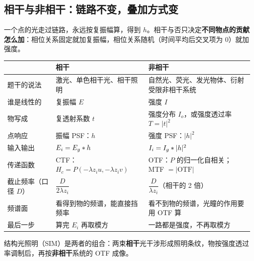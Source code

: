 \subsection*{相干与非相干：链路不变，叠加方式变}\label{sec:p-cohtable}
一个点的光走过链路，永远按复振幅算，得到 $h$。相干与否只决定\textbf{不同物点的贡献怎么加}：相位关系固定就加复振幅，相位关系随机（时间平均后交叉项为 0）就加强度。
\begin{center}\small\renewcommand{\arraystretch}{1.45}
\begin{tabular}{@{}P{3.1cm}P{6.4cm}P{6.9cm}@{}}
\toprule
 & 相干 & 非相干\\ \midrule
题干的说法 & 激光、单色相干光、相干照明 & 自然光、荧光、发光物体、衍射受限非相干系统\\
谁是线性的 & 复振幅 $E$ & 强度 $I$\\
物写成 & 复透射系数 $t$ & 强度分布 $I_o$，或强度透过率 $T=|t|^2$\\
点响应 & 振幅 PSF：$h$ & 强度 PSF：$|h|^2$\\
输入输出 & $E_i=E_g\ast h$ & $I_i=I_g\ast|h|^2$\\
传递函数 & CTF：$H_c=P(-\lambda z_iu,-\lambda z_iv)$ & OTF：$P$ 的归一化自相关；MTF $=|\mathrm{OTF}|$\\
截止频率（口径 $D$） & $\dfrac{D}{2\lambda z_i}$ & $\dfrac{D}{\lambda z_i}$（相干的 2 倍）\\
频谱面 & 看得到物的频谱，能直接挡频率 & 看不到物的频谱，光瞳的作用要用 OTF 算\\
最后一步 & 算完 $E_i$ 再取模方 & 一路都是强度，不再取模方\\
\bottomrule
\end{tabular}
\end{center}
结构光照明（SIM）是两者的组合：两束\textbf{相干}光干涉形成照明条纹，物按强度透过率调制后，再按\textbf{非相干}系统的 OTF 成像。

